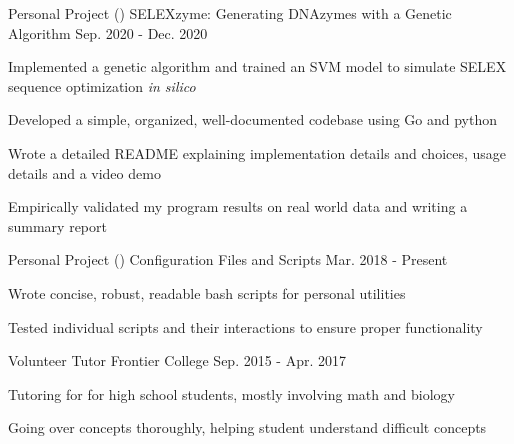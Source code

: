\begin{cventries}
	\cventry
      {Personal Project ()}
      {SELEXzyme: Generating DNAzymes with a Genetic Algorithm}
      {}
      {Sep. 2020 - Dec. 2020}
      {
        \begin{cvitems}
          \item{Implemented a genetic algorithm and trained an SVM model to simulate SELEX sequence optimization \textit{in silico}}
          \item{Developed a simple, organized, well-documented codebase using Go and python}
          \item{Wrote a detailed README explaining implementation details and choices, usage details and a video demo}
          \item{Empirically validated my program results on real world data and writing a summary report}
        \end{cvitems}
      }
	\cventry
      {Personal Project ()}
      {Configuration Files and Scripts}
      {}
      {Mar. 2018 - Present}
      {
        \begin{cvitems}
          \item{Wrote concise, robust, readable bash scripts for personal utilities}
          \item{Tested individual scripts and their interactions to ensure proper functionality}
        \end{cvitems}
      }
  \cventry
    {Volunteer Tutor} %
    {Frontier College}
    {} %
    {Sep. 2015 - Apr. 2017} %
    {
      \begin{cvitems}
        \item{Tutoring for for high school students, mostly involving math and biology}
        \item{Going over concepts thoroughly, helping student understand difficult concepts}
      \end{cvitems}
    }
\end{cventries}
